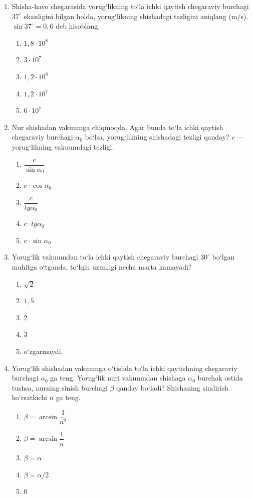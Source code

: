 \begin{enumerate}
\item Shisha-havo chegarasida yorug‘likning to‘la ichki qaytish chegaraviy burchagi $37^\circ$ ekanligini bilgan holda, yorug‘likning shishadagi tezligini aniqlang (m/s). $\sin37^\circ=0,6$ deb hisoblang.
\begin{enumerate}[label=\Alph*)]
\item $1,8\cdot10^8$
\item $3\cdot10^7$
\item $1,2\cdot10^8$
\item $1,2\cdot10^7$
\item $6\cdot10^7$
\end{enumerate}

\item Nur shishadan vakuumga chiqmoqda. Agar bunda to‘la ichki qaytish chegaraviy burchagi $\alpha_0$ bo‘lsa, yorug‘likning shishadagi tezligi qanday? $c$ — yorug‘likning vakuumdagi tezligi.
\begin{enumerate}[label=\Alph*)]
\item $\dfrac{c}{\sin\alpha_0}$
\item $c\cdot \cos\alpha_0$
\item $\dfrac{c}{tg\alpha_0}$
\item $c\cdot tg\alpha_0$
\item $c\cdot \sin\alpha_0$
\end{enumerate}

\item Yorug‘lik vakuumdan to‘la ichki qaytish chegaraviy burchagi $30^\circ$ bo‘lgan muhitga o‘tganda, to‘lqin uzunligi necha marta kamayadi?
\begin{enumerate}[label=\Alph*)]
\item $\sqrt{2}$
\item $1,5$
\item $2$
\item $3$
\item o‘zgarmaydi.
\end{enumerate}

\item Yorug‘lik shishadan vakuumga o‘tishda to‘la ichki qaytishning chegaraviy burchagi $\alpha_0$ ga teng. Yorug‘lik nuri vakuumdan shishaga $\alpha_0$ burchak ostida tushsa, nurning sinish burchagi $\beta$ qanday bo‘ladi? Shishaning sindirish ko‘rsatkichi $n$ ga teng.
\begin{enumerate}[label=\Alph*)]
\item $\beta=\arcsin\dfrac{1}{n^2}$
\item $\beta=\arcsin\dfrac{1}{n}$
\item $\beta=\alpha$
\item $\beta=\alpha/2$
\item $0$
\end{enumerate}



\end{enumerate}
